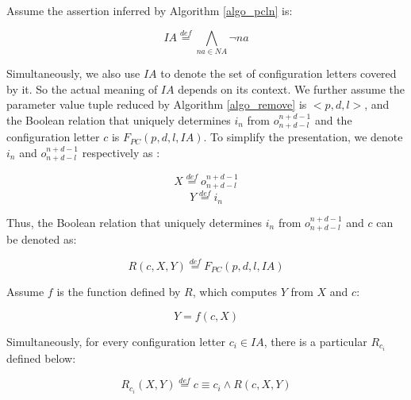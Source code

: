 \documentclass[journal]{IEEEtran}
\begin{document}
Assume the assertion inferred by Algorithm \ref{algo_pcln} is:

\begin{equation}\label{equ_fdia}
IA\stackrel{def}{=}\bigwedge_{na\in NA}\neg na
\end{equation}

Simultaneously,
we also use $IA$ to denote the set of configuration letters covered by it.
So the actual meaning of $IA$ depends on its context.
We further assume the parameter value tuple reduced by Algorithm \ref{algo_remove} is $<p, d, l>$,
and the Boolean relation that uniquely determines $i_n$ from $o_{n+d-l}^{n+d-1}$ and the configuration letter $c$ is $F_{PC}(p,d,l,IA)$.
To simplify the presentation, we denote $i_n$ and $o_{n+d-l}^{n+d-1}$ respectively as :

\begin{equation}\label{equ_fdin}
X\stackrel{def}{=} o_{n+d-l}^{n+d-1}
\end{equation}
\begin{equation}\label{equ_fdo}
Y\stackrel{def}{=} i_n
\end{equation}

Thus,
the Boolean relation that uniquely determines $i_n$ from $o_{n+d-l}^{n+d-1}$ and $c$ can be denoted as:

\begin{equation}\label{equ_fdR}
R(c,X,Y)\stackrel{def}{=} F_{PC}(p,d,l,IA)
\end{equation}


Assume $f$ is the function defined by $R$,
which computes  $Y$ from $X$ and $c$:

\begin{equation}\label{equ_fdf}
Y=f(c,X)
\end{equation}

Simultaneously,
for every configuration letter $c_i\in IA$,
there is a particular $R_{c_i}$ defined below:

\begin{equation}\label{equ_fdRci}
R_{c_i}(X,Y)\stackrel{def}{=}c\equiv c_i\wedge R(c,X,Y)
\end{equation}
\end{document}
